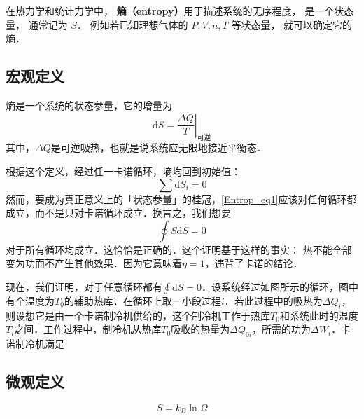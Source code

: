 
在热力学和统计力学中， \textbf{熵（entropy）}用于描述系统的无序程度， 是一个状态量， 通常记为 $S$． 例如若已知理想气体的 $P, V, n, T$ 等状态量， 就可以确定它的熵． %

\subsection{宏观定义}

熵是一个系统的状态参量，它的增量为
\begin{equation}
\mathrm{d} S = \left . \frac{\Delta Q}{T}\right |_{\text{可逆}}
\end{equation}
其中，$\Delta Q$是可逆吸热，也就是说系统应无限地接近平衡态．

根据这个定义，经过任一卡诺循环，墒均回到初始值：
\begin{equation} \label{Entrop_eq1}
\sum{\text{d}S_i=0}
\end{equation}
然而，要成为真正意义上的「状态参量」的桂冠，\eqref{Entrop_eq1}应该对任何循环都成立，而不是只对卡诺循环成立．换言之，我们想要
\begin{equation}
\oint S \mathrm d S =0
\end{equation}
对于所有循环均成立．这恰恰是正确的．这个证明基于这样的事实： 热不能全部变为功而不产生其他效果．因为它意味着$\eta=1$，违背了卡诺的结论．

现在，我们证明，对于任意循环都有$\oint \mathrm d S =0 $．设系统经过如图所示的循环，图中有个温度为$T_0$的辅助热库．在循环上取一小段过程$i$．若此过程中的吸热为$\Delta Q_i$，则设想它是由一个卡诺制冷机供给的，这个制冷机工作于热库$T_0$和系统此时的温度$T_i$之间．工作过程中，制冷机从热库$T_0$吸收的热量为$\Delta Q_{0i}$，所需的功为$\Delta W_i$．卡诺制冷机满足


\subsection{微观定义}
\begin{equation}
S = k_B \ln \Omega
\end{equation}

 
